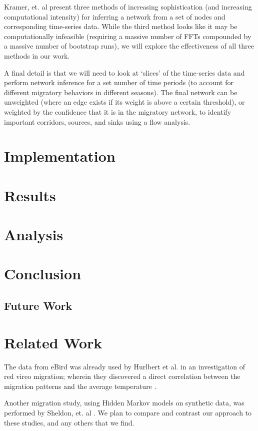 \documentclass[11pt]{sigplanconf}
\begin{document}
Kramer, et. al present three methods of increasing sophistication (and increasing computational intensity) for inferring a network from a set of nodes and corresponding time-series data. While the third method looks like it may be computationally infeasible (requiring a massive number of FFTs compounded by a massive number of bootstrap runs), we will explore the effectiveness of all three methods in our work. 

A final detail is that we will need to look at `slices' of the time-series data and perform network inference for a set number of time periods (to account for different migratory behaviors in different seasons). The final network can be unweighted (where an edge exists if its weight is above a certain threshold), or weighted by the confidence that it is in the migratory network, to identify important corridors, sources, and sinks using a flow analysis. 

\section{Implementation}

\section{Results}

\section{Analysis}

\section{Conclusion}
\subsection{Future Work}

\section{Related Work}
The data from eBird was already used by Hurlbert et al. in an investigation of red vireo migration; wherein they discovered a direct correlation between the migration patterns and the average temperature \cite{hurlbert}. 

Another migration study, using Hidden Markov models on synthetic data, was performed by Sheldon, et. al \cite{conf/nips/SheldonEK07}. We plan to compare and contrast our approach to these studies, and any others that we find.



\end{document}
